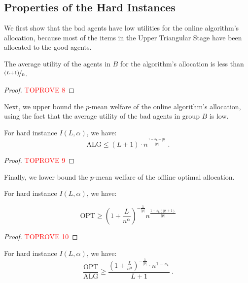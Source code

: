 \documentclass[11pt,letterpaper]{article}
\newcommand{\OPT}{\mathrm{OPT}}
\newcommand{\ALG}{\mathrm{ALG}}
\begin{document}
\subsection{Properties of the Hard Instances}

We first show that the bad agents have low utilities for the online algorithm's allocation, because most of the items in the Upper Triangular Stage have been allocated to the good agents.


\begin{lemma}
    \label{lem:hardness-negative}
    The average utility of the agents in $B$ for the algorithm's allocation is less than $\nicefrac{(L+1)}{n}$.
\end{lemma}



\begin{proof}\textcolor{red}{TOPROVE 8}\end{proof}


Next, we upper bound the $p$-mean welfare of the online algorithm's allocation, using the fact that the average utility of the bad agents in group $B$ is low.

\begin{lemma}
	\label{lem:hardness-negative-algorithm}
	For hard instance $I(L, \alpha)$, we have:
	\[
		\ALG \le (L+1) \cdot n^{\frac{1-s_L-|p|}{|p|}}
		~.
	\]	
\end{lemma}

\begin{proof}\textcolor{red}{TOPROVE 9}\end{proof}



Finally, we lower bound the $p$-mean welfare of the offline optimal allocation.

\begin{lemma}
	\label{lem:hardness-negative-optimal}
	For  hard instance $I(L, \alpha)$, we have:
	
	\[
		\OPT \ge \left(1+\frac{L}{n^{\alpha}} \right)^{-\frac{1}{|p|}} n^{\frac{1-s_L(|p|+1)}{|p|}}
	\]	
\end{lemma}

\begin{proof}\textcolor{red}{TOPROVE 10}\end{proof}


\begin{corollary}
	\label{cor:hardness-negative}
	For hard instance $I(L, \alpha)$, we have:
	\[
		\frac{\OPT}{\ALG} \ge \frac{\left(1+\frac{L}{n^{\alpha}}\right)^{-\frac{1}{|p|}} \cdot n^{1-s_L}}{L+1}
		~.
	\]
\end{corollary}
\end{document}
